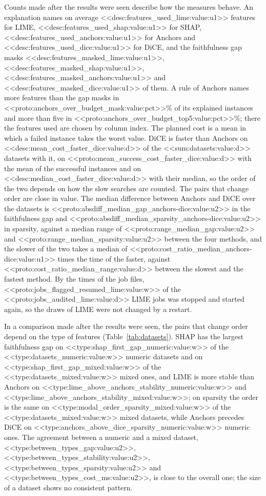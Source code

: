 \documentclass[10pt,a4paper,twocolumn]{article}
\begin{document}
Counts made after the results were seen describe how the measures behave. An
explanation names on average <<desc:features_used_lime:value:u1>> features for LIME,
<<desc:features_used_shap:value:u1>> for SHAP, <<desc:features_used_anchors:value:u1>> for
Anchors and <<desc:features_used_dice:value:u1>> for DiCE, and the faithfulness gap masks
<<desc:features_masked_lime:value:u1>>, <<desc:features_masked_shap:value:u1>>,
<<desc:features_masked_anchors:value:u1>> and <<desc:features_masked_dice:value:u1>> of
them. A rule of Anchors names more features than the gap masks in
<<proto:anchors_over_budget_mask:value:pct>>\% of its explained instances and more than
five in <<proto:anchors_over_budget_top5:value:pct>>\%; there the features used are
chosen by column index. The planned cost is a mean in which a failed instance takes the
worst value. DiCE is faster than Anchors on <<desc:mean_cost_faster_dice:value:d>> of the
<<sum:datasets:value:d>> datasets with it, on
<<proto:mean_success_cost_faster_dice:value:d>> with the mean of the successful instances
and on <<desc:median_cost_faster_dice:value:d>> with their median, so the order of the
two depends on how the slow searches are counted. The pairs that change order are close
in value. The median difference between Anchors and DiCE over the datasets is
<<proto:absdiff_median_gap_anchors-dice:value:u2>> in the faithfulness gap and
<<proto:absdiff_median_sparsity_anchors-dice:value:u2>> in sparsity, against a median
range of <<proto:range_median_gap:value:u2>> and <<proto:range_median_sparsity:value:u2>>
between the four methods, and the slower of the two takes a median of
<<proto:cost_ratio_median_anchors-dice:value:u1>> times the time of the faster, against
<<proto:cost_ratio_median_range:value:d>> between the slowest and the fastest method. By
the times of the job files, <<proto:jobs_flagged_resumed_lime:value:w>> of the
<<proto:jobs_audited_lime:value:d>> LIME jobs was stopped and started again, so the
draws of LIME were not changed by a restart.

In a comparison made after the results were seen, the pairs that change order depend on
the type of features (Table~\ref{tab:datasets}). SHAP has the largest faithfulness gap on
<<type:shap_first_gap_numeric:value:w>> of the <<type:datasets_numeric:value:w>> numeric
datasets and on <<type:shap_first_gap_mixed:value:w>> of the
<<type:datasets_mixed:value:w>> mixed ones, and LIME is more stable than Anchors on
<<type:lime_above_anchors_stability_numeric:value:w>> and
<<type:lime_above_anchors_stability_mixed:value:w>>; on sparsity the order is the same on
<<type:modal_order_sparsity_mixed:value:w>> of the <<type:datasets_mixed:value:w>> mixed
datasets, while Anchors precedes
DiCE on <<type:anchors_above_dice_sparsity_numeric:value:w>> numeric ones. The agreement
between a numeric and a mixed dataset, <<type:between_types_gap:value:u2>>,
<<type:between_types_stability:value:u2>>, <<type:between_types_sparsity:value:u2>> and
<<type:between_types_cost_ms:value:u2>>, is close to the overall one; the size of a dataset
shows no consistent pattern.
\end{document}
